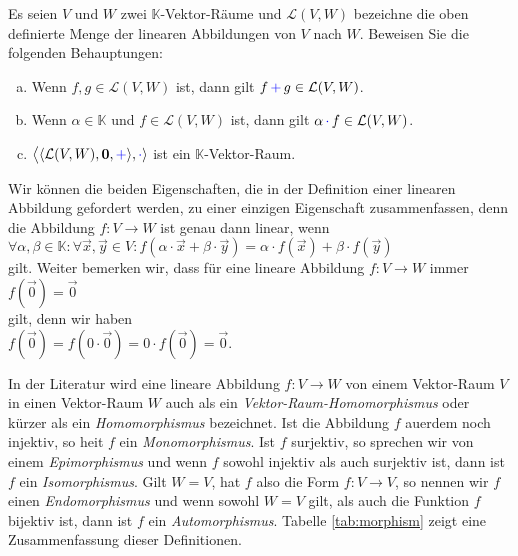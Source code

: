 \exercise
Es seien $V$ und $W$ zwei $\mathbb{K}$-Vektor-R\"{a}ume und $\mathcal{L}(V, W)$ bezeichne die oben
definierte Menge der linearen Abbildungen von $V$ nach $W$.  Beweisen Sie die folgenden Behauptungen:
\begin{enumerate}[(a)]
\item Wenn $f,g \in \mathcal{L}(V,W)$ ist,  dann gilt $f \,{\color{blue}+}\, g \in \mathcal{L}(V, W)$.
\item Wenn $\alpha \in \mathbb{K}$ und $f \in \mathcal{L}(V,W)$ ist,  dann gilt  $\alpha \,{\color{blue}\cdot}\, f \in \mathcal{L}(V, W)$.
\item $\bigl\langle \langle \mathcal{L}(V, W), \mathbf{0}, {\color{blue}+} \rangle, {\color{blue}\cdot} \rangle$ ist ein $\mathbb{K}$-Vektor-Raum.
      \eoxs
\end{enumerate}

\remark
Wir k\"{o}nnen die beiden Eigenschaften, die in der Definition einer linearen Abbildung gefordert werden, zu 
einer einzigen Eigenschaft zusammenfassen, denn die Abbildung $f:V \rightarrow W$ ist genau dann linear, wenn
\\[0.2cm]
\hspace*{1.3cm}
$\forall \alpha, \beta \in \mathbb{K}: \forall \vec{x}, \vec{y} \in V: f(\alpha \cdot \vec{x} + \beta \cdot \vec{y}) = \alpha \cdot f(\vec{x}) + \beta \cdot f(\vec{y})$
\\[0.2cm]
gilt.  Weiter bemerken wir, dass f\"{u}r eine lineare Abbildung $f:V \rightarrow W$ immer
\\[0.2cm]
\hspace*{1.3cm}
$f(\vec{0}) = \vec{0}$
\\[0.2cm]
gilt, denn wir haben
\\[0.2cm]
\hspace*{1.3cm}
$f(\vec{0}) = f(0 \cdot \vec{0}) = 0 \cdot f(\vec{0}) = \vec{0}$.
\eoxs

\remark
In der Literatur wird eine lineare Abbildung $f:V \rightarrow W$ von einem Vektor-Raum $V$ in einen
Vektor-Raum $W$ auch als ein {\emph{\color{blue}Vektor-Raum-Homomorphismus}} oder k\"{u}rzer als ein
{\emph{\color{blue}Homomorphismus}} bezeichnet.  Ist die Abbildung $f$ au\3erdem noch injektiv, so hei\3t $f$ ein
{\emph{\color{blue}Monomorphismus}}.  Ist $f$ surjektiv, so sprechen wir von einem {\emph{\color{blue}Epimorphismus}} und wenn
$f$ sowohl injektiv als auch surjektiv ist, dann ist $f$ ein {\emph{\color{blue}Isomorphismus}}.  Gilt $W = V$,
hat $f$ also die Form $f: V \rightarrow V$, so nennen wir $f$ einen {\emph{\color{blue}Endomorphismus}} und wenn
sowohl $W=V$ gilt, als auch die Funktion $f$ bijektiv ist, dann ist $f$ ein {\emph{\color{blue}Automorphismus}}. 
Tabelle \ref{tab:morphism} zeigt eine Zusammenfassung dieser Definitionen.


